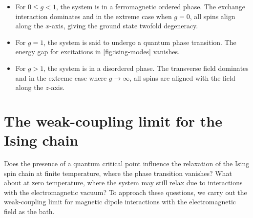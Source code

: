 \documentclass[../thesis.tex]{subfiles}
\begin{document}
\begin{itemize}
  \item For $0 \le g < 1$, the system is in a ferromagnetic ordered phase. The
    exchange interaction dominates and in the extreme case when $g = 0$, all
    spins align along the $x$-axis, giving the ground state twofold degeneracy.

  \item For $g = 1$, the system is said to undergo a quantum phase transition.
    The energy gap for excitations in \cref{fig:ising-modes} vanishes.

  \item For $g > 1$, the system is in a disordered phase. The transverse field
    dominates and in the extreme case where $g \to \infty$, all spins are
    aligned with the field along the $z$-axis.
\end{itemize}


\section{The weak-coupling limit for the Ising chain}\label{sec:weak-ising}

Does the presence of a quantum critical point influence the relaxation of the
Ising spin chain at finite temperature, where the phase transition vanishes?
What about at zero temperature, where the system may still relax due to
interactions with the electromagnetic vacuum? To approach these questions, we
carry out the weak-coupling limit for magnetic dipole interactions with the
electromagnetic field as the bath.
\end{document}
